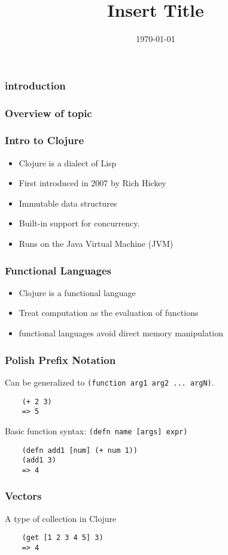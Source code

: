 \documentclass{beamer}
\newcommand{\clocode}[1]{{\texttt {#1}}}
\begin{document}
\title{Insert Title}
\date{\today}


\begin{frame}[fragile]
	\frametitle{introduction}

\end{frame}

\begin{frame}[fragile]
\frametitle{Overview of topic}
\end{frame}

\begin{frame}[fragile]
\frametitle{Intro to Clojure}
	\begin{itemize}
  	 \item Clojure is a dialect of Lisp
  	 \item First introduced in 2007 by Rich Hickey
  	 \item Immutable data structures
	 \item Built-in support for concurrency.
	 \item Runs on the Java Virtual Machine (JVM)
	\end{itemize}
\end{frame}

\begin{frame}[fragile]
\frametitle{Functional Languages}
	\begin{itemize}
	 \item Clojure is a functional language
  	 \item Treat computation as the evaluation of functions
  	 \item functional languages avoid direct memory manipulation
       \end{itemize}
\end{frame}

\begin{frame}[fragile]
\frametitle{Polish Prefix Notation}
Can be generalized to \clocode{(function arg1 arg2 ... argN)}.
	\begin{verbatim}
	(+ 2 3)
	=> 5
	\end{verbatim}
Basic function syntax: \clocode{(defn name [args] expr)}
	\begin{verbatim}
	(defn add1 [num] (+ num 1))
	(add1 3)
	=> 4
	\end{verbatim}
\end{frame}

\begin{frame}[fragile]
\frametitle{Vectors}
A type of collection in Clojure
	\begin{verbatim}
	(get [1 2 3 4 5] 3)	
	=> 4
	\end{verbatim}
\end{frame}
\end{document}
